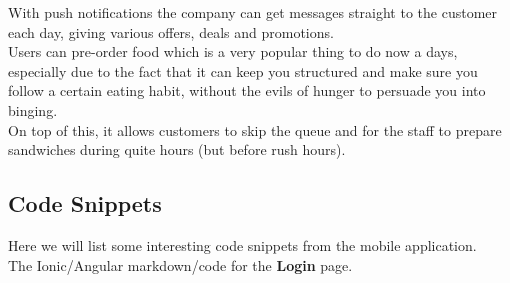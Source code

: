 With push notifications the company can get messages straight to the customer each day, giving various offers, deals and promotions.
\\

Users can pre-order food which is a very popular thing to do now a days, especially due to the fact that it can keep you structured and make sure you follow a certain eating habit, without the evils of hunger to persuade you into binging.
\\

On top of this, it allows customers to skip the queue and for the staff to prepare sandwiches during quite hours (but before rush hours).

\subsection{Code Snippets}
Here we will list some interesting code snippets from the mobile application.
\\

The Ionic/Angular markdown/code for the \textbf{Login} page.

